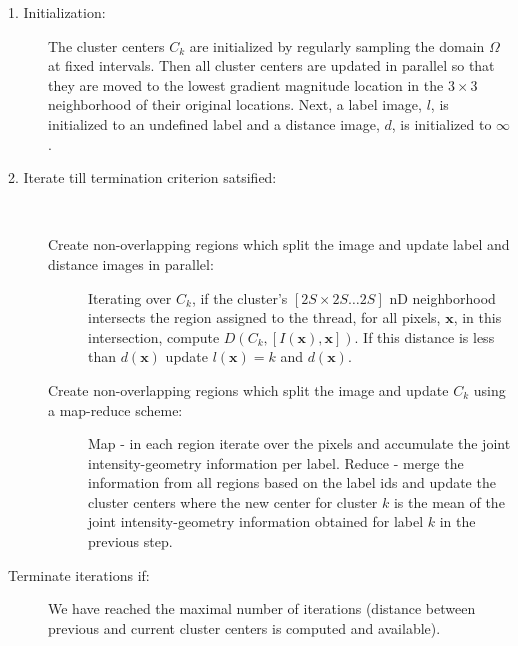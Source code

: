 \documentclass{InsightArticle}
\begin{document}
\begin{description}
\item[1. Initialization:] The cluster centers $C_k$ are initialized by
regularly sampling the domain $\Omega$ at fixed intervals. Then
all cluster centers are updated in parallel so that they are moved to 
the lowest gradient magnitude location in the $3 \times 3$ neighborhood
of their original locations. Next, a label image, $l$, is
initialized to an undefined label and a distance image, $d$, is
initialized to $\infty$.

\item[2. Iterate till termination criterion satsified:] \hfill  \\[-4mm]

\begin{description}
\item [Create non-overlapping regions which split the image and update label and distance
images in parallel:] Iterating over $C_k$, if the cluster's $[2S \times 2S \ldots 2S]$ nD neighborhood
intersects the region assigned to the thread, for all pixels, $\mathbf{x}$, in this intersection,
compute $D(C_k, [I(\mathbf{x}),\mathbf{x}])$. If this distance is less than
$d(\mathbf{x})$ update $l(\mathbf{x})=k$ and $d(\mathbf{x})$.

\item [Create non-overlapping regions which split the image and update $C_k$ using a map-reduce scheme:]
Map - in each region iterate over the pixels and accumulate the joint intensity-geometry information per
label. Reduce - merge the information from all regions based on the label ids and update the cluster centers
where the new center for cluster $k$  is the mean of the joint intensity-geometry information obtained for
label $k$ in the previous step.

\end{description}

\item[Terminate iterations if:] We have reached the maximal number of iterations (distance between previous and current
cluster centers is computed and available).



\end{description}
\end{document}
